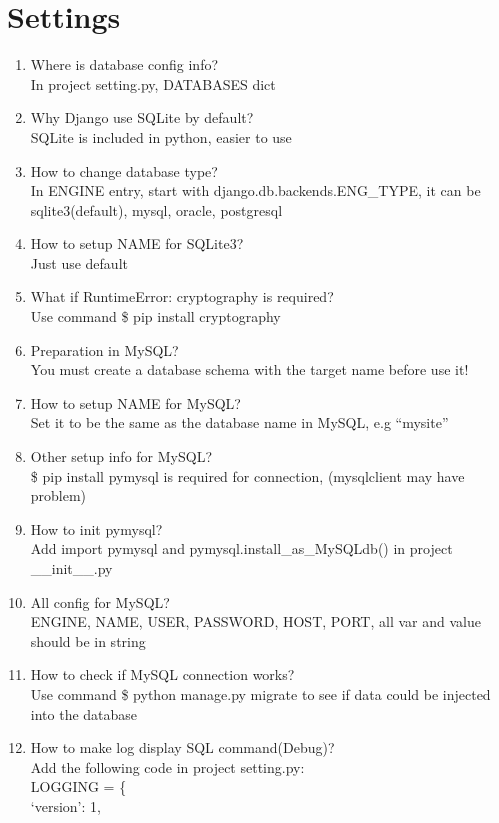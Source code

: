 \documentclass[10pt,a4paper,oneside]{article}
\begin{document}
\section{Settings}
\begin{enumerate}[1.]
\item Where is database config info?\\
In project setting.py, DATABASES dict
\item Why Django use SQLite by default?\\
SQLite is included in python, easier to use
\item How to change database type?\\
In ENGINE entry, start with django.db.backends.ENG\_TYPE, it can be sqlite3(default), mysql, oracle, postgresql
\item How to setup NAME for SQLite3?\\
Just use default
\item What if RuntimeError: cryptography is required?\\
Use command \$ pip install cryptography
\item Preparation in MySQL?\\
You must create a database schema with the target name before use it!
\item How to setup NAME for MySQL?\\
Set it to be the same as the database name in MySQL, e.g ``mysite''
\item Other setup info for MySQL?\\
\$ pip install pymysql is required for connection, (mysqlclient may have problem)
\item How to init pymysql?\\
 Add import pymysql and pymysql.install\_as\_MySQLdb() in project \_\_init\_\_.py
\item All config for MySQL?\\
ENGINE, NAME, USER, PASSWORD, HOST, PORT, all var and value should be in string
\item How to check if MySQL connection works?\\
Use command \$ python manage.py migrate to see if data could be injected into the database
\item How to make log display SQL command(Debug)?\\
Add the following code in project setting.py: \\
LOGGING = \{\\
\indent\quad\quad	`version': 1,\\

\end{enumerate}
\end{document}

